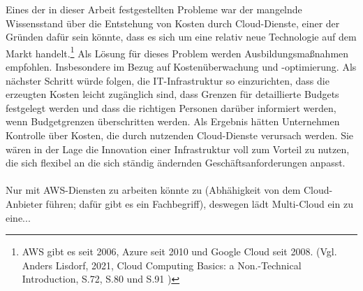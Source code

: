 Eines der in dieser Arbeit festgestellten Probleme war der mangelnde Wissensstand über die Entstehung von Kosten durch Cloud-Dienste, einer der Gründen dafür sein könnte, dass es sich um eine relativ neue Technologie auf dem Markt handelt.\footnote{AWS gibt es seit 2006, Azure seit 2010 und Google Cloud seit 2008. (Vgl. Anders Lisdorf, 2021, Cloud Computing Basics: a Non.-Technical Introduction, S.72, S.80 und S.91 \cite{CCB})}
Als Lösung für dieses Problem werden 
Ausbildungsmaßnahmen empfohlen. Insbesondere im Bezug auf Kostenüberwachung und -optimierung. Als nächster Schritt würde folgen, die IT-Infrastruktur so einzurichten, dass die erzeugten Kosten leicht zugänglich sind, dass Grenzen für detaillierte Budgets festgelegt werden und dass die richtigen Personen darüber informiert werden, wenn Budgetgrenzen überschritten werden. Als Ergebnis hätten Unternehmen Kontrolle über Kosten, die durch nutzenden Cloud-Dienste verursach werden. Sie wären in der Lage die Innovation einer Infrastruktur voll zum Vorteil zu nutzen, die sich flexibel an die sich ständig ändernden Geschäftsanforderungen anpasst.
\\\\
Nur mit AWS-Diensten zu arbeiten könnte zu (Abhähigkeit von dem Cloud-Anbieter führen; dafür gibt es ein Fachbegriff), deswegen lädt Multi-Cloud ein zu eine...
